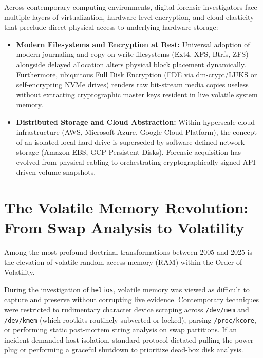 Across contemporary computing environments, digital forensic investigators face multiple layers of virtualization, hardware-level encryption, and cloud elasticity that preclude direct physical access to underlying hardware storage:
\begin{itemize}
    \item \textbf{Modern Filesystems and Encryption at Rest:} Universal adoption of modern journaling and copy-on-write filesystems (Ext4, XFS, Btrfs, ZFS) alongside delayed allocation alters physical block placement dynamically. Furthermore, ubiquitous Full Disk Encryption (FDE via dm-crypt/LUKS or self-encrypting NVMe drives) renders raw bit-stream media copies useless without extracting cryptographic master keys resident in live volatile system memory.
    \item \textbf{Distributed Storage and Cloud Abstraction:} Within hyperscale cloud infrastructure (AWS, Microsoft Azure, Google Cloud Platform), the concept of an isolated local hard drive is superseded by software-defined network storage (Amazon EBS, GCP Persistent Disks). Forensic acquisition has evolved from physical cabling to orchestrating cryptographically signed API-driven volume snapshots.
\end{itemize}

\section{The Volatile Memory Revolution: From Swap Analysis to Volatility}

Among the most profound doctrinal transformations between 2005 and 2025 is the elevation of volatile random-access memory (RAM) within the Order of Volatility.

During the investigation of \texttt{helios}, volatile memory was viewed as difficult to capture and preserve without corrupting live evidence. Contemporary techniques were restricted to rudimentary character device scraping across \texttt{/dev/mem} and \texttt{/dev/kmem} (which rootkits routinely subverted or locked), parsing \texttt{/proc/kcore}, or performing static post-mortem string analysis on swap partitions. If an incident demanded host isolation, standard protocol dictated pulling the power plug or performing a graceful shutdown to prioritize dead-box disk analysis.

